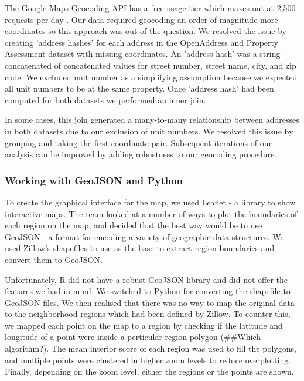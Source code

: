 \documentclass[12pt]{article}
\begin{document}
The Google Maps Geocoding API has a free usage tier which maxes out at
2,500 requests per day \cite{GettingS89:online}. Our data required
geocoding an order of magnitude more coordinates so this approach was
out of the question. We resolved the issue by creating 'address hashes'
for each address in the OpenAddress and Property Assessment dataset
with missing coordinates. An 'address hash' was a string concatenated
of concatenated values for street number, street name, city, and zip
code. We excluded unit number as a simplifying assumption because we
expected all unit numbers to be at the same property. Once 'address
hash' had been computed for both datasets we performed an inner join.

In some cases, this join generated a many-to-many relationship between
addresses in both datasets due to our exclusion of unit numbers. We
resolved this issue by grouping and taking the first coordinate pair.
Subsequent iterations of our analysis can be improved by adding
robustness to our geocoding procedure.

\subsubsection{Working with GeoJSON and Python}

To create the graphical interface for the map, we used Leaflet
\cite{Leafleta41:online,Leafletf18:online} - a library to show
interactive maps. The team looked at a number of ways to plot the
boundaries of each region on the map, and decided that the best way would
be to use GeoJSON \cite{RFC7946T67:online} - a format for encoding a
variety of geographic data structures. We used Zillow's shapefiles
\cite{ZillowNe81:online} to use as the base to extract region boundaries
and convert them to GeoJSON. 

Unfortunately, R did not have a robust GeoJSON library and did not 
offer the features we had in mind. We switched to Python for converting
the shapefile to GeoJSON files. We then realised that there was no way to
map the original data to the neighborhood regions which had been defined
by Zillow. To counter this, we mapped each point on the map to a region
by checking if the latitude and longitude of a point were inside a
perticular region polygon (##Which algorithm?). The mean interior score
of each region was used to fill the polygons, and multiple points were
clustered in higher zoom levels to reduce overplotting. Finally,
depending on the zoom level, either the regions or the points are shown.
\end{document}

